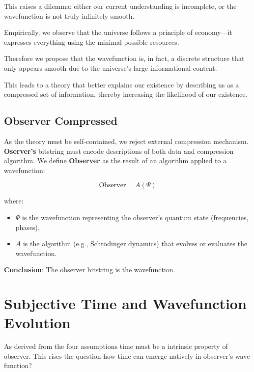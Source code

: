 \documentclass[11pt]{article}
\begin{document}
This raises a dilemma: either our current understanding is incomplete, or the wavefunction is not truly infinitely smooth.

Empirically, we observe that the universe follows a principle of economy—it expresses everything using the minimal possible resources.

Therefore we propose that the wavefunction is, in fact, a discrete structure that only appears smooth due to the universe’s large informational content.

This leads to a theory that better explains our existence by describing us as a compressed set of information, thereby increasing the likelihood of our existence.


\subsection{Observer Compressed}

As the theory must be self-contained, we reject external compression mechanism. \textbf{Oserver's} bitstring must encode descriptions of both data and compression algorithm. We define \textbf{Observer} as the result of an algorithm applied to a wavefunction:

\begin{equation}
      \text{Observer} = A(\Psi)
\end{equation}

where:
\begin{itemize}
      \item \( \Psi \) is the wavefunction representing the observer's quantum state (frequencies, phases),
      \item \( A \) is the algorithm (e.g., Schrödinger dynamics) that evolves or evaluates the wavefunction.
\end{itemize}

\vspace{1em}


\textbf{Conclusion}: The observer bitstring is the wavefunction.



\section{Subjective Time and Wavefunction Evolution}

As derived from the four assumptions \cite{meskanen2008} time must be a intrinsic property of observer. This rises the question how time can emerge natively in observer's wave function?
\end{document}
